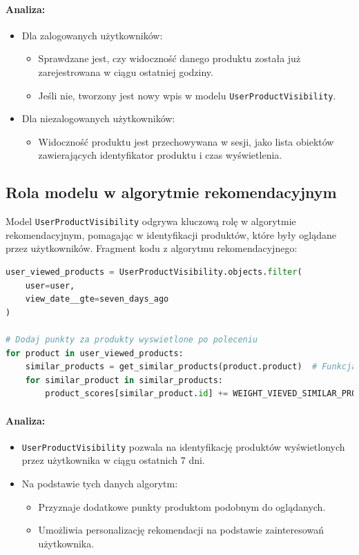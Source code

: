 \documentclass[12pt,a4paper,oneside]{article}
\theoremstyle{definition}
\numberwithin{equation}{section}
\begin{document}
\paragraph{Analiza:}
\begin{itemize}
    \item Dla zalogowanych użytkowników:
    \begin{itemize}
        \item Sprawdzane jest, czy widoczność danego produktu została już zarejestrowana w ciągu ostatniej godziny.
        \item Jeśli nie, tworzony jest nowy wpis w modelu \texttt{UserProductVisibility}.
    \end{itemize}
    \item Dla niezalogowanych użytkowników:
    \begin{itemize}
        \item Widoczność produktu jest przechowywana w sesji, jako lista obiektów zawierających identyfikator produktu i czas wyświetlenia.
    \end{itemize}
\end{itemize}

\subsection{Rola modelu w algorytmie rekomendacyjnym}
Model \texttt{UserProductVisibility} odgrywa kluczową rolę w algorytmie rekomendacyjnym, pomagając w identyfikacji produktów, które były oglądane przez użytkowników. Fragment kodu z algorytmu rekomendacyjnego:

\begin{lstlisting}[language=Python]
user_viewed_products = UserProductVisibility.objects.filter(
    user=user,
    view_date__gte=seven_days_ago
)

# Dodaj punkty za produkty wyswietlone po poleceniu
for product in user_viewed_products:
    similar_products = get_similar_products(product.product)  # Funkcja generujaca podobne produkty
    for similar_product in similar_products:
        product_scores[similar_product.id] += WEIGHT_VIEVED_SIMILAR_PRODUCT
\end{lstlisting}

\paragraph{Analiza:}
\begin{itemize}
    \item \texttt{UserProductVisibility} pozwala na identyfikację produktów wyświetlonych przez użytkownika w ciągu ostatnich 7 dni.
    \item Na podstawie tych danych algorytm:
    \begin{itemize}
        \item Przyznaje dodatkowe punkty produktom podobnym do oglądanych.
        \item Umożliwia personalizację rekomendacji na podstawie zainteresowań użytkownika.
    \end{itemize}
\end{itemize}
\end{document}

